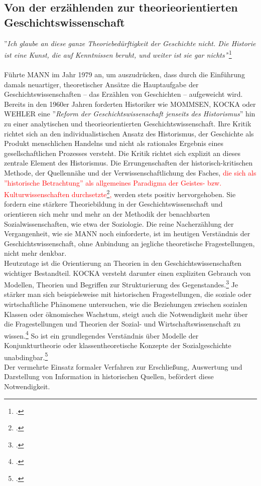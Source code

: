 \documentclass[12pt,a4paper]{article}
\begin{document}
\subsection{Von der erzählenden zur theorieorientierten Geschichtswissenschaft}

''\textit{Ich glaube an diese ganze Theoriebedürftigkeit der Geschichte nicht. Die Historie ist eine Kunst, die auf Kenntnissen beruht, und weiter ist sie gar nichts'}'\footcite[][S.53]{mann1979pladoyer}
\\
\\
Führte MANN im Jahr 1979 an, um auszudrücken, dass durch die Einführung damals neuartiger, theoretischer Ansätze die Hauptaufgabe der Geschichtswissenschaften --  das Erzählen von Geschichten -- aufgeweicht wird. Bereits in den 1960er Jahren forderten Historiker wie MOMMSEN, KOCKA oder WEHLER eine ''\textit{Reform der Geschichtswissenschaft jenseits des Historismus}'' hin zu einer analytischen und theorieorientierten Geschichtswissenschaft. Ihre Kritik richtet sich an den individualistischen Ansatz des Historismus, der Geschichte als Produkt menschlichen Handelns und nicht als rationales Ergebnis eines gesellschaftlichen Prozesses versteht. Die Kritik richtet sich explizit an dieses zentrale Element des Historismus. Die Errungenschaften der historisch-kritischen Methode, der Quellennähe und der Verwissenschaftlichung des Faches, \textcolor{red}{die sich als ''historische Betrachtung'' als allgemeines Paradigma der Geistes- bzw. Kulturwissenschaften durchsetzte\footcite[][S.28]{hardtwig1990geschichtskultur},} werden stets positiv hervorgehoben. Sie fordern eine stärkere Theoriebildung in der Geschichtswissenschaft und orientieren sich mehr und mehr an der Methodik der benachbarten Sozialwissenschaften, wie etwa der Soziologie. Die reine Nacherzählung der Vergangenheit, wie sie MANN noch einforderte, ist im heutigen Verständnis der Geschichtswissenschaft, ohne Anbindung an jegliche theoretische Fragestellungen, nicht mehr denkbar.
\\
Heutzutage ist die Orientierung an Theorien in den Geschichtswissenschaften wichtiger Bestandteil. KOCKA versteht darunter einen expliziten Gebrauch von Modellen, Theorien und Begriffen zur Strukturierung des Gegenstandes.\footcite[][S.2]{magerski2009schreibt} Je stärker man sich beispielsweise mit historischen Fragestellungen, die soziale oder wirtschaftliche Phänomene untersuchen, wie die Beziehungen zwischen sozialen Klassen oder öknomisches Wachstum, steigt auch die Notwendigkeit mehr über die Fragestellungen und Theorien der Sozial- und Wirtschaftswissenschaft zu wissen.\footcite[][S.6-8]{kocka1982theorien} So ist ein grundlegendes Verständnis über Modelle der Konjunkturtheorie oder klassentheoretische Konzepte der Sozialgeschichte unabdingbar.\footcite[][S.1]{sokollgrundlagen}
\\
Der vermehrte Einsatz formaler Verfahren zur Erschließung, Auswertung und Darstellung von Information in historischen Quellen, befördert diese Notwendigkeit.
\end{document}
